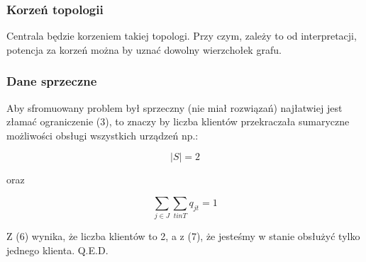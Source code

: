 \documentclass{article}
\begin{document}
\subsubsection{Korzeń topologii}

Centrala będzie korzeniem takiej topologi. Przy czym, zależy to od interpretacji, potencja za korzeń można by uznać dowolny wierzchołek grafu.

\subsubsection{Dane sprzeczne}

Aby sfromuowany problem był sprzeczny (nie miał rozwiązań) najłatwiej jest złamać ograniczenie (3),
to znaczy by liczba klientów przekraczała sumaryczne możliwości obsługi wszystkich urządzeń np.:

\begin{equation}
  |S| = 2
\end{equation}

oraz

\begin{equation}
  \sum_{j \in J} \sum_{t in T} q_{jt} = 1
\end{equation}

Z (6) wynika, że liczba klientów to 2, a z (7), że jesteśmy w stanie obsłużyć tylko jednego klienta. Q.E.D.
\end{document}
